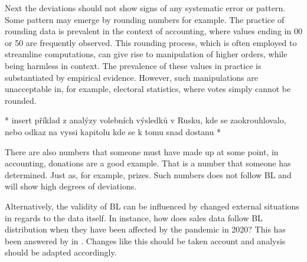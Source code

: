 


Next the deviations should not show signs of any systematic error or pattern. Some pattern may emerge by rounding numbers for example. The practice of rounding data is prevalent in the context of accounting, where values ending in 00 or 50 are frequently observed. This rounding process, which is often employed to streamline computations, can give rise to manipulation of higher orders, while being harmless in context. The prevalence of these values in practice is substantiated by empirical evidence. %
However, such manipulations are unacceptable in, for example, electoral statistics, where votes simply cannot be rounded.
\cite{kossovsky2014benford}

\begin{koment}
    * insert příklad z analýzy volebních výsledků v Rusku, kde se zaokrouhlovalo, nebo odkaz na vyssi kapitolu kde se k tomu snad dostanu * 
\end{koment}

There are also numbers that someone must have made up at some point, in accounting, donations are a good example. That is a number that someone has determined. Just as, for example, prizes. Such numbers does not follow BL and will show high degrees of deviations. \cite{kossovsky2014benford}

Alternatively, the validity of BL can be influenced by changed external situations in regards to the data itself. In instance, how does sales data follow BL distribution when they have been affected by the pandemic in 2020? This has been answered by \citeauthor{Hronova2023} in \citeyear{Hronova2023}. Changes like this should be taken account and analysis should be adapted accordingly.


